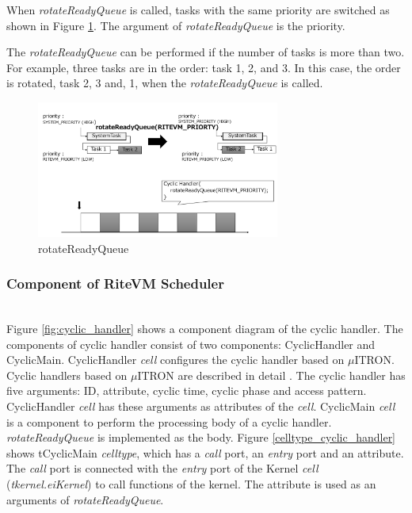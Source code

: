 \documentclass[conference,compsoc]{IEEEtran}
\begin{document}
When {\it rotateReadyQueue} is called, tasks with the same priority are switched as shown in Figure \ref{fig:rotateReadyQueue}.
The argument of {\it rotateReadyQueue} is the priority.

The {\it rotateReadyQueue} can be performed if the number of tasks is more than two.
For example, three tasks are in the order: task 1, 2, and 3.
In this case, the order is rotated, task 2, 3 and, 1, when the {\it rotateReadyQueue} is called.

\begin{figure}[t]
    \centering
    \includegraphics[width=8cm,clip]{figure/rotateReadyQueue.pdf}
    \caption{rotateReadyQueue}
    \label{fig:rotateReadyQueue}
\end{figure} 
 
\subsubsection{Component of RiteVM Scheduler} \mbox{}\\

Figure \ref{fig:cyclic_handler} shows a component diagram of the cyclic handler.
The components of cyclic handler consist of two components: CyclicHandler and CyclicMain.
CyclicHandler {\it cell} configures the cyclic handler based on $\mu$ITRON.
Cyclic handlers based on $\mu$ITRON are described in detail \cite{par:microITRON}.
The cyclic handler has five arguments: ID, attribute, cyclic time, cyclic phase and access pattern.
CyclicHandler {\it cell} has these arguments as attributes of the {\it cell}.
CyclicMain {\it cell} is a component to perform the processing body of a cyclic handler.
{\it rotateReadyQueue} is implemented as the body.
Figure \ref{celltype_cyclic_handler} shows tCyclicMain {\it celltype}, which has a {\it call} port, an {\it entry} port and an attribute.
The {\it call} port is connected with the {\it entry} port of the Kernel {\it cell} ({\it tkernel.eiKernel}) to call functions of the kernel. 
The attribute is used as an arguments of {\it rotateReadyQueue}.
\end{document}
